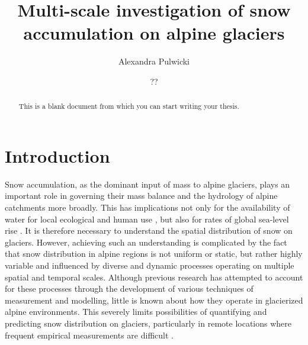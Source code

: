 \documentclass{sfuthesis}
\title{Multi-scale investigation of snow accumulation on alpine glaciers}
\author{Alexandra Pulwicki}
\date{??}
\begin{document}
\frontmatter
\maketitle{}
\makecommittee{}

\begin{abstract}
	This is a blank document from which you can start writing your thesis.
\end{abstract}


\begin{dedication} %
\end{dedication}


\begin{acknowledgements} %
\end{acknowledgements}

\tableofcontents\clearpage
{}\listoftables\clearpage
{}\listoffigures






\mainmatter%

\chapter{Introduction}

Snow accumulation, as the dominant input of mass to alpine glaciers, plays an important role in governing their mass balance and the hydrology of alpine catchments more broadly. This has implications not only for the availability of water for local ecological and human use \citep{Barnett2005,ONeel2014}, but also for rates of global sea-level rise \citep{Gardner2013}. It is therefore necessary to understand the spatial distribution of snow on glaciers. However, achieving such an understanding is complicated by the fact that snow distribution in alpine regions is not uniform or static, but rather highly variable and influenced by diverse and dynamic processes operating on multiple spatial and temporal scales. Although previous research has attempted to account for these processes through the development of various techniques of measurement and modelling, little is known about how they operate in glacierized alpine environments. This severely limits possibilities of quantifying and predicting snow distribution on glaciers, particularly in remote locations where frequent empirical measurements are difficult \citep{Nolan2015}.
\end{document}
